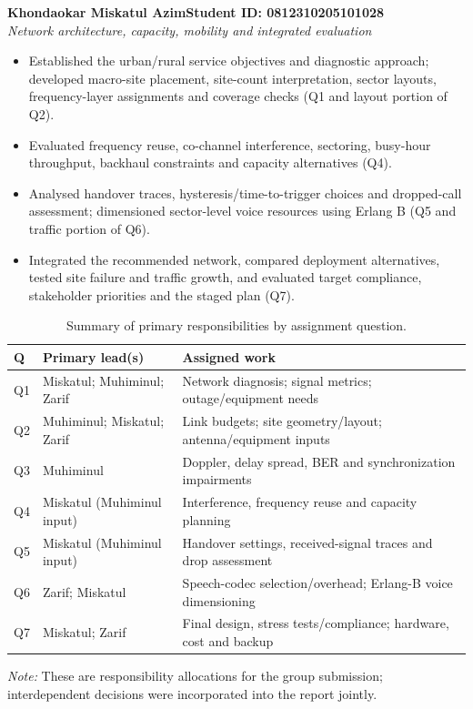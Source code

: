 \documentclass[9pt,a4paper]{extarticle}
\begin{document}
\vspace{4pt}
\noindent\textbf{Khondaokar Miskatul Azim}\hfill\textbf{Student ID: 0812310205101028}\\[-1pt]
\textit{Network architecture, capacity, mobility and integrated evaluation}
\begin{itemize}[leftmargin=1.5em,topsep=3pt,itemsep=1.5pt,parsep=0pt]
  \item Established the urban/rural service objectives and diagnostic approach;
  developed macro-site placement, site-count interpretation, sector layouts,
  frequency-layer assignments and coverage checks (Q1 and layout portion of Q2).
  \item Evaluated frequency reuse, co-channel interference, sectoring,
  busy-hour throughput, backhaul constraints and capacity alternatives (Q4).
  \item Analysed handover traces, hysteresis/time-to-trigger choices and
  dropped-call assessment; dimensioned sector-level voice resources using
  Erlang B (Q5 and traffic portion of Q6).
  \item Integrated the recommended network, compared deployment alternatives,
  tested site failure and traffic growth, and evaluated target compliance,
  stakeholder priorities and the staged plan (Q7).
\end{itemize}

\vspace{4pt}
\begin{table}[H]
\centering\small
\caption{Summary of primary responsibilities by assignment question.}
\begin{tabularx}{\textwidth}{@{}p{1.0cm}>{\raggedright\arraybackslash}p{3.55cm}X@{}}\toprule
\textbf{Q} & \textbf{Primary lead(s)} & \textbf{Assigned work} \\ \midrule
Q1 & Miskatul; Muhiminul; Zarif & Network diagnosis; signal metrics; outage/equipment needs \\
Q2 & Muhiminul; Miskatul; Zarif & Link budgets; site geometry/layout; antenna/equipment inputs \\
Q3 & Muhiminul & Doppler, delay spread, BER and synchronization impairments \\
Q4 & Miskatul (Muhiminul input) & Interference, frequency reuse and capacity planning \\
Q5 & Miskatul (Muhiminul input) & Handover settings, received-signal traces and drop assessment \\
Q6 & Zarif; Miskatul & Speech-codec selection/overhead; Erlang-B voice dimensioning \\
Q7 & Miskatul; Zarif & Final design, stress tests/compliance; hardware, cost and backup \\ \bottomrule
\end{tabularx}
\end{table}

\noindent\textit{Note:} These are responsibility allocations for the group
submission; interdependent decisions were incorporated into the report jointly.
\end{document}
